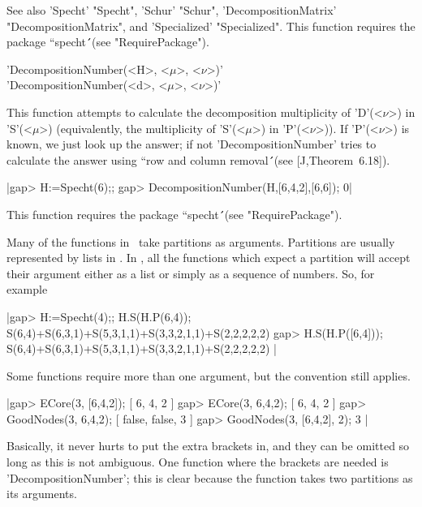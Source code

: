 See also 'Specht' "Specht", 'Schur' "Schur", 'DecompositionMatrix'
"DecompositionMatrix", and 'Specialized' "Specialized". This function
requires the package ``specht\'\'\ (see "RequirePackage").



'DecompositionNumber(<H>, <$\mu$>, <$\nu$>)'\\
'DecompositionNumber(<d>, <$\mu$>, <$\nu$>)'

This function attempts to calculate the decomposition multiplicity of 
'D'(<$\nu$>) in 'S'(<$\mu$>) (equivalently, the multiplicity of 
'S'(<$\mu$>) in 'P'(<$\nu$>)). If 'P'(<$\nu$>) is known, we just look up 
the answer; if not 'DecompositionNumber' tries to calculate the answer 
using ``row and column removal\'\'\ (see [J,Theorem~6.18]).

|gap> H:=Specht(6);;
gap> DecompositionNumber(H,[6,4,2],[6,6]);  
0|

This function requires the package ``specht\'\'\ (see "RequirePackage").



Many of the functions in \Specht\ take partitions as arguments.
Partitions are usually represented by lists in \GAP. In \Specht, 
all the functions which expect a partition will accept their argument 
either as a list or simply as a sequence of numbers. So, for example\:

|gap> H:=Specht(4);; H.S(H.P(6,4));
S(6,4)+S(6,3,1)+S(5,3,1,1)+S(3,3,2,1,1)+S(2,2,2,2,2)
gap> H.S(H.P([6,4]));
S(6,4)+S(6,3,1)+S(5,3,1,1)+S(3,3,2,1,1)+S(2,2,2,2,2) |

Some functions require more than one argument, but the convention still
applies.

|gap> ECore(3, [6,4,2]);
[ 6, 4, 2 ]
gap> ECore(3, 6,4,2);   
[ 6, 4, 2 ] 
gap> GoodNodes(3, 6,4,2);    
[ false, false, 3 ]
gap> GoodNodes(3, [6,4,2], 2);
3 |

Basically, it never hurts to put the extra brackets in, and they can
be omitted so long as this is not ambiguous. One function where the
brackets are needed is 'DecompositionNumber'; this is clear because 
the function takes two partitions as its arguments.


